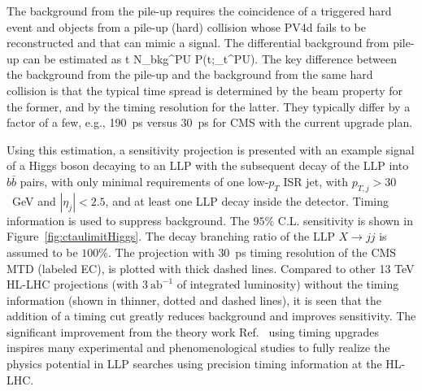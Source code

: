 The background from the pile-up requires the coincidence of a triggered hard event and objects from a pile-up (hard) collision whose PV4d fails to be reconstructed and that can mimic a signal. The differential background from pile-up can be estimated as
\beq
{} {\partial \Delta t} \simeq N_{\rm bkg}^{\rm PU}
{\mathcal P}(\Delta t;\delta_t^{\rm PU}).
\label{eq:bkgPU}
\eeq
The key difference between the background from the pile-up and the background from the same hard collision is that the typical time spread is determined by the beam property for the former, and by the timing resolution for the latter. They typically differ by a factor of a few, e.g., 190~ps versus 30~ps for CMS with the current upgrade plan.

Using this estimation, a sensitivity projection is presented with an example signal of a Higgs boson decaying to an LLP with the subsequent decay of the LLP into $b \bar b$ pairs, with only minimal requirements of one low-$p_T$ ISR jet, with $p_{T,j} > 30$~GeV and $|\eta_j| < 2.5$, and at least one LLP decay inside the detector. Timing information is used to suppress background. The $95\%$ C.L. sensitivity is shown in Figure~\ref{fig:ctaulimitHiggs}. The decay branching ratio of the LLP $X \to j j$ is assumed to be $100\%$. The projection with $30$~ps timing resolution of the CMS MTD (labeled EC), is plotted with thick dashed lines. Compared to other 13 TeV HL-LHC projections (with $3 ~\text{ab}^{-1}$ of integrated luminosity) without the timing information (shown in thinner, dotted and dashed lines), it is seen that the addition of a timing cut greatly reduces background and improves sensitivity. The significant improvement from the theory work Ref.~\cite{Liu:2018wte} using timing upgrades inspires many experimental and phenomenological studies to fully realize the physics potential in LLP searches using precision timing information at the HL-LHC.


